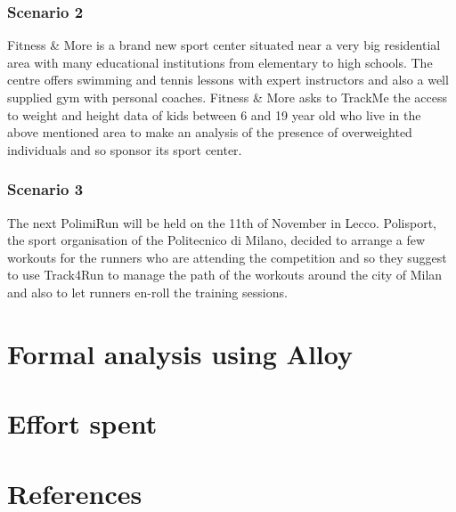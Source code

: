 \documentclass{article}
\begin{document}
\subsubsection{Scenario 2}
Fitness \& More is a brand new sport center situated near a very big 
residential area with many educational institutions from elementary to 
high schools. The centre offers swimming and tennis lessons with
expert instructors and also a well supplied gym with personal coaches.
Fitness \& More asks to TrackMe the access to weight and height data 
of kids between 6 and 19 year old who live in the above mentioned area 
to make an analysis of the presence of overweighted individuals and so
sponsor its sport center. 

\subsubsection{Scenario 3}
The next PolimiRun will be held on the 11th of November in Lecco.
Polisport, the sport organisation of the Politecnico di Milano, 
decided to arrange a few workouts for the runners who are attending 
the competition and so they suggest to use Track4Run to manage the 
path of the workouts around the city of Milan and also to let runners
en-roll the training sessions. 

\section{Formal analysis using Alloy}

\section{Effort spent}

\section{References}
\end{document}
